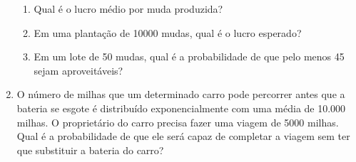 \begin{enumerate}
	\begin{enumerate}[label=\alph*.]
		\item Qual é o lucro médio por muda produzida?
		\item Em uma plantação de 10000 mudas, qual é o lucro esperado?
		\item Em um lote de 50 mudas, qual é a probabilidade de que pelo menos 45 sejam aproveitáveis?
	\end{enumerate}

\item O número de milhas que um determinado carro pode percorrer antes que a bateria se esgote é distribuído exponencialmente com uma média de 10.000 milhas. O proprietário do carro precisa fazer uma viagem de 5000 milhas. Qual é a probabilidade de que ele será capaz de completar a viagem sem ter que substituir a bateria do carro?

\end{enumerate}




